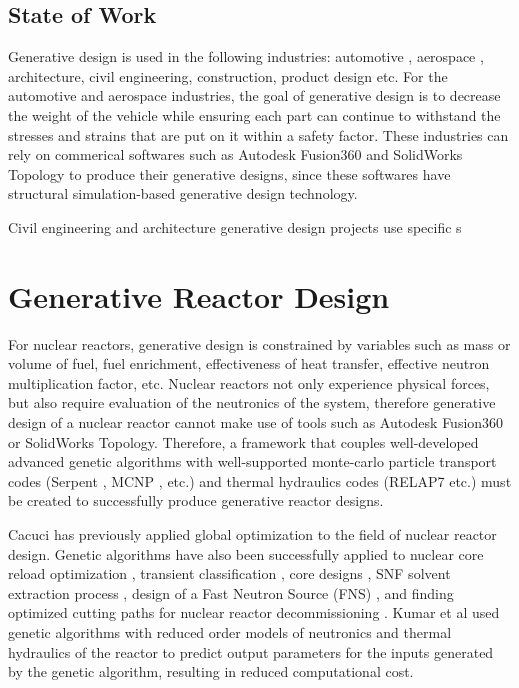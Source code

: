 \subsection{State of Work}
Generative design is used in the following industries: 
automotive \cite{deplazes_autodesk_2019}, aerospace \cite{byrne_evolving_2014},
architecture, civil engineering, construction, product design etc. 
For the automotive and aerospace industries, the goal of generative 
design is to decrease 
the weight of the vehicle while ensuring each part can continue to 
withstand the stresses and strains that are put on it within a 
safety factor. 
These industries can rely on commerical softwares such as 
Autodesk Fusion360 \cite{autodesk_autodesk_2020} and  
SolidWorks Topology \cite{lombard_solidworks_2008}
to produce their generative designs, since these softwares have 
structural simulation-based generative design technology.  

Civil engineering and architecture generative design projects use specific s

\section{Generative Reactor Design}
For nuclear reactors, generative design is constrained by 
variables such as mass or volume of fuel, fuel enrichment, effectiveness 
of heat transfer, effective neutron multiplication factor, etc. 
Nuclear reactors not only experience physical forces, but also
require evaluation of the neutronics of the system, therefore generative design of 
a nuclear reactor cannot make use of tools such as Autodesk Fusion360 or SolidWorks 
Topology. 
Therefore, a framework that couples well-developed advanced genetic algorithms 
with well-supported monte-carlo particle transport 
codes (Serpent \cite{leppanen_serpent_2014}, 
MCNP \cite{werner_mcnp6._2018}, etc.) and thermal hydraulics 
codes (RELAP7 \cite{andrs_relap-7_2012} etc.)
must be created to successfully produce generative reactor designs. 

Cacuci \cite{cacuci_global_1990} has previously applied global optimization 
to the field of nuclear reactor design. 
Genetic algorithms have also been successfully applied to nuclear core reload optimization
\cite{dechaine_nuclear_1995,chapot_new_1999,schirru_genetic_1997,feltus_incorporating_1997}, 
transient classification \cite{alvarenga_adaptive_1997, mol_neural_2006}, 
core designs \cite{pereira_basic_1999,kumar_new_2015}, 
\gls{SNF} solvent extraction process 
\cite{omori_applications_1997}, design of a Fast Neutron Source (FNS) 
\cite{pevey_genetic_2019}, and finding optimized cutting paths for nuclear 
reactor decommissioning \cite{tsai_computer_2019}.  
Kumar et al \cite{kumar_new_2015} used genetic algorithms with reduced order models 
of neutronics and thermal hydraulics of the reactor to predict output parameters 
for the inputs generated by the genetic algorithm, resulting in reduced computational 
cost. 

